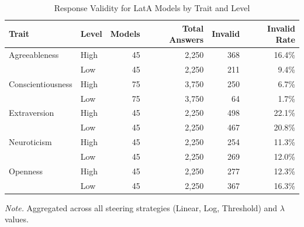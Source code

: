 \begin{table}[htbp]
\begin{threeparttable}
\caption{Response Validity for LatA Models by Trait and Level}
\label{tab:lata_trait_validity}
\centering
\begin{tabular}{llrrrr}
\toprule
Trait & Level & Models & Total Answers & Invalid & Invalid Rate \\
\midrule
  Agreeableness & High & 45 & 2,250 & 368 & 16.4\% \\
   & Low & 45 & 2,250 & 211 & 9.4\% \\
\addlinespace
  Conscientiousness & High & 75 & 3,750 & 250 & 6.7\% \\
   & Low & 75 & 3,750 & 64 & 1.7\% \\
\addlinespace
  Extraversion & High & 45 & 2,250 & 498 & 22.1\% \\
   & Low & 45 & 2,250 & 467 & 20.8\% \\
\addlinespace
  Neuroticism & High & 45 & 2,250 & 254 & 11.3\% \\
   & Low & 45 & 2,250 & 269 & 12.0\% \\
\addlinespace
  Openness & High & 45 & 2,250 & 277 & 12.3\% \\
   & Low & 45 & 2,250 & 367 & 16.3\% \\
\bottomrule
\end{tabular}
\begin{tablenotes}
\footnotesize
\item \textit{Note.} Aggregated across all steering strategies (Linear, Log, Threshold) and $\lambda$ values.
\end{tablenotes}
\end{threeparttable}
\end{table}